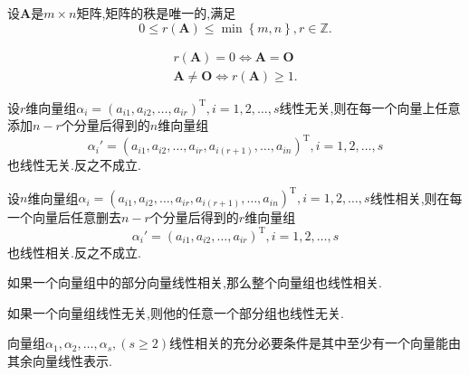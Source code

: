 \begin{ttheorem}
    设$\mathbf{A}$是$m\times n$矩阵,矩阵的秩是唯一的,满足
    \begin{equation*}
        0\leqslant  r(\mathbf{A}) \leqslant \min\left\{m,n\right\} ,r\in\mathbb{Z} .
    \end{equation*}
\end{ttheorem}
\begin{ttheorem}
    \begin{gather*}
        r(\mathbf{A})=0 \iff \mathbf{A}=\mathbf{O}\\
        \mathbf{A} \neq \mathbf{O} \iff r(\mathbf{A}) \geqslant 1.
    \end{gather*}
\end{ttheorem}
\begin{theorem}[向量组的线性相关]

    \begin{ttheorem}
        设$r$维向量组$\alpha_i=(a_{i1},a_{i2},\dots,a_{ir})^\mathrm{T},i=1,2,\dots,s$线性无关,则在每一个向量上任意添加$n-r$个分量后得到的$n$维向量组
        \begin{equation*}
            \alpha_i'=(a_{i1},a_{i2},\dots,a_{ir},a_{i(r+1)},\dots,a_{in})^\mathrm{T},i=1,2,\dots,s
        \end{equation*}
        也线性无关.反之不成立.
    \end{ttheorem}

    \begin{ttheorem}
        设$n$维向量组$\alpha_i=(a_{i1},a_{i2},\dots,a_{ir},a_{i(r+1)},\dots,a_{in})^\mathrm{T},i=1,2,\dots,s$线性相关,则在每一个向量后任意删去$n-r$个分量后得到的$r$维向量组
        \begin{equation*}
            \alpha_i'=(a_{i1},a_{i2},\dots,a_{ir})^\mathrm{T},i=1,2,\dots,s
        \end{equation*}
        也线性相关.反之不成立.
    \end{ttheorem}

    \begin{ttheorem}
        如果一个向量组中的部分向量线性相关,那么整个向量组也线性相关.
    \end{ttheorem}
    
    \begin{ttheorem}
        如果一个向量组线性无关,则他的任意一个部分组也线性无关.
    \end{ttheorem}
\end{theorem}

\begin{ttheorem}
    向量组$\alpha_1,\alpha_2,\dots,\alpha_s,(s \geqslant 2)$线性相关的充分必要条件是其中至少有一个向量能由其余向量线性表示.
\end{ttheorem}

